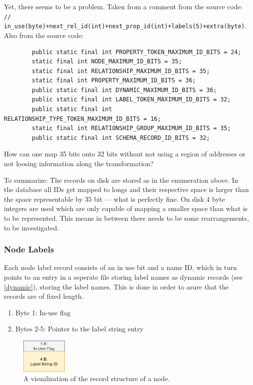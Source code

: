 \documentclass[a4paper,10pt]{article}
\begin{document}
    Yet, there seems to be a problem.
    Taken from a comment from the source code: \\
    \texttt{// in_use(byte)+next_rel_id(int)+next_prop_id(int)+labels(5)+extra(byte)}. \\
    Also from the source code:
     \begin{verbatim}
        public static final int PROPERTY_TOKEN_MAXIMUM_ID_BITS = 24;
        static final int NODE_MAXIMUM_ID_BITS = 35;
        static final int RELATIONSHIP_MAXIMUM_ID_BITS = 35;
        static final int PROPERTY_MAXIMUM_ID_BITS = 36;
        public static final int DYNAMIC_MAXIMUM_ID_BITS = 36;
        public static final int LABEL_TOKEN_MAXIMUM_ID_BITS = 32;
        public static final int RELATIONSHIP_TYPE_TOKEN_MAXIMUM_ID_BITS = 16;
        static final int RELATIONSHIP_GROUP_MAXIMUM_ID_BITS = 35;
        public static final int SCHEMA_RECORD_ID_BITS = 32;
     \end{verbatim}\label{addr_size}
     How can one map 35 bits onto 32 bits without not using a region of addresses or not loosing information along the transformation?
     
    To summarize: The records on disk are stored as in the enumeration above. In the database all IDs get mapped to longs and their respective space is larger than the space representable by 35 bit --- what is perfectly fine.
    On disk 4 byte integers are used which are only capable of mapping a smaller space than what is to be represented. This means in between there needs to be some rearrangements, to be investigated.
    
    \subsubsection{Node Labels}
    Each node label record consists of an in use bit and a name ID, which in turn points to an entry in a seperate file storing label names as dynamic records (see \ref{dynamic}), storing the label names. This is done in order to asure that the records are of fixed length.
    \begin{enumerate}
     \item Byte 1: In-use flag
     \item Bytes 2-5: Pointer to the label string entry
    \end{enumerate}
    
    \begin{figure}[htp]\label{label_record}
        \begin{center}
            \includegraphics[keepaspectratio,height=0.2\textheight,width=0.2\textwidth]{img/label_record.png}
        \end{center}
        \caption{A visualization of the record structure of a node.} %
    \end{figure}
\end{document}
